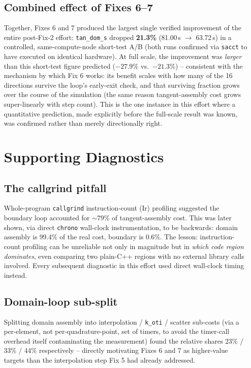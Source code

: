 \documentclass[11pt]{article}
\begin{document}
\subsection*{Combined effect of Fixes 6--7}
Together, Fixes 6 and 7 produced the largest single verified improvement
of the entire post-Fix-2 effort: \texttt{tan\_dom\_s} dropped
\textbf{21.3\%} (81.00\,s $\to$ 63.72\,s) in a controlled, same-compute-node
short-test A/B (both runs confirmed via \texttt{sacct} to have executed on
identical hardware). At full scale, the improvement was \emph{larger} than
this short-test figure predicted ($-27.9\%$ vs.\ $-21.3\%$) -- consistent
with the mechanism by which Fix 6 works: its benefit scales with how many
of the 16 directions survive the loop's early-exit check, and that
surviving fraction grows over the course of the simulation (the same
reason tangent-assembly cost grows super-linearly with step count). This
is the one instance in this effort where a quantitative prediction, made
explicitly before the full-scale result was known, was confirmed rather
than merely directionally right.

\section{Supporting Diagnostics}\label{sec:diagnostics}

\subsection{The callgrind pitfall}
Whole-program \texttt{callgrind} instruction-count (Ir) profiling
suggested the boundary loop accounted for $\sim$79\% of tangent-assembly
cost. This was later shown, via direct \texttt{chrono} wall-clock
instrumentation, to be backwards: domain assembly is 99.4\% of the real
cost, boundary is 0.6\%. The lesson: instruction-count profiling can be
unreliable not only in magnitude but in \emph{which code region
dominates}, even comparing two plain-C++ regions with no external library
calls involved. Every subsequent diagnostic in this effort used direct
wall-clock timing instead.

\subsection{Domain-loop sub-split}
Splitting domain assembly into interpolation / \texttt{k\_oti} /
scatter sub-costs (via a per-element, not per-quadrature-point, set of
timers, to avoid the timer-call overhead itself contaminating the
measurement) found the relative shares 23\% / 33\% / 44\% respectively --
directly motivating Fixes 6 and 7 as higher-value targets than the
interpolation step Fix 5 had already addressed.
\end{document}
